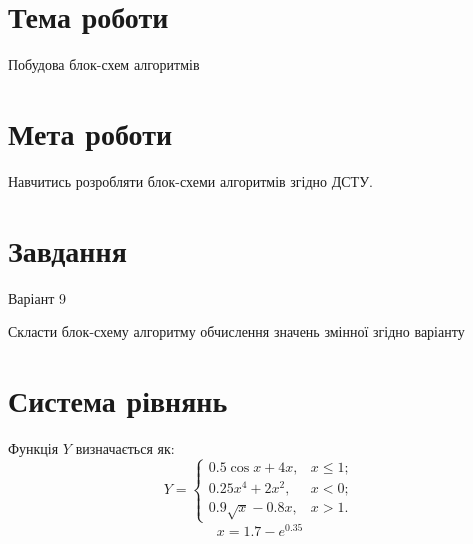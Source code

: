 \documentclass[a4paper]{article}
\begin{document}
\section*{Тема роботи}
Побудова блок-схем алгоритмів

\section*{Мета роботи}
Навчитись розробляти блок-схеми алгоритмів згідно ДСТУ.

\section*{Завдання}
Варіант 9

Скласти блок-схему алгоритму обчислення значень змінної згідно варіанту



\section*{Система рівнянь}
Функція \( Y \) визначається як:
\begin{equation*}
    Y = \begin{cases} 
        0.5\cos x + 4x, & x \leq 1; \\ 
        0.25x^4 + 2x^2, & x < 0; \\
        0.9\sqrt{x} - 0.8x, & x > 1.
    \end{cases}
\end{equation*}
\begin{equation*}
    x = 1.7 - e^{0.35}
\end{equation*}

\end{document}
